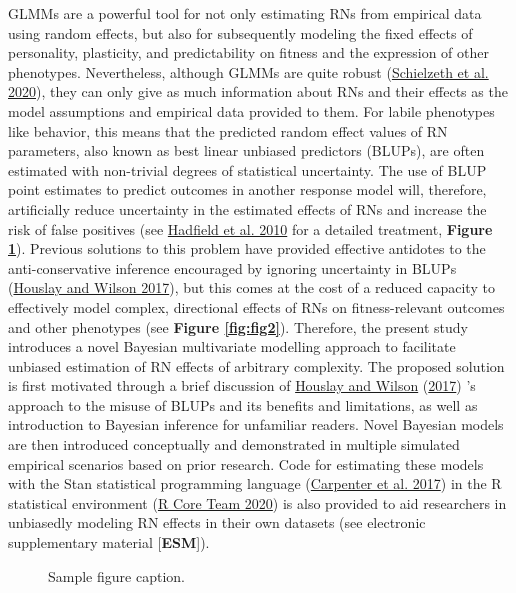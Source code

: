 \documentclass{article}
\begin{document}
GLMMs are a powerful tool for not only estimating RNs from empirical
data using random effects, but also for subsequently modeling the fixed
effects of personality, plasticity, and predictability on fitness and
the expression of other phenotypes. Nevertheless, although GLMMs are
quite robust (\protect\hyperlink{ref-Schiel2020}{Schielzeth et al.
2020}), they can only give as much information about RNs and their
effects as the model assumptions and empirical data provided to them.
For labile phenotypes like behavior, this means that the predicted
random effect values of RN parameters, also known as best linear
unbiased predictors (BLUPs), are often estimated with non-trivial
degrees of statistical uncertainty. The use of BLUP point estimates to
predict outcomes in another response model will, therefore, artificially
reduce uncertainty in the estimated effects of RNs and increase the risk
of false positives (see \protect\hyperlink{ref-Hadfield2010}{Hadfield et
al. 2010} for a detailed treatment, \textbf{Figure \ref{fig:fig1}}).
Previous solutions to this problem have provided effective antidotes to
the anti-conservative inference encouraged by ignoring uncertainty in
BLUPs (\protect\hyperlink{ref-Hous2017}{Houslay and Wilson 2017}), but
this comes at the cost of a reduced capacity to effectively model
complex, directional effects of RNs on fitness-relevant outcomes and
other phenotypes (see \textbf{Figure \ref{fig:fig2}}). Therefore, the
present study introduces a novel Bayesian multivariate modelling
approach to facilitate unbiased estimation of RN effects of arbitrary
complexity. The proposed solution is first motivated through a brief
discussion of \protect\hyperlink{ref-Hous2017}{Houslay and Wilson}
(\protect\hyperlink{ref-Hous2017}{2017}) 's approach to the misuse of
BLUPs and its benefits and limitations, as well as introduction to
Bayesian inference for unfamiliar readers. Novel Bayesian models are
then introduced conceptually and demonstrated in multiple simulated
empirical scenarios based on prior research. Code for estimating these
models with the Stan statistical programming language
(\protect\hyperlink{ref-Stan}{Carpenter et al. 2017}) in the R
statistical environment (\protect\hyperlink{ref-Rbase}{R Core Team
2020}) is also provided to aid researchers in unbiasedly modeling RN
effects in their own datasets (see electronic supplementary material
{[}\textbf{ESM}{]}).

\begin{figure}
  \centering
  \fbox{\rule[-.5cm]{8cm}{11cm} \rule[-.5cm]{8cm}{0cm}}
  \caption{Sample figure caption.}
  \label{fig:fig1}
\end{figure}
\end{document}
